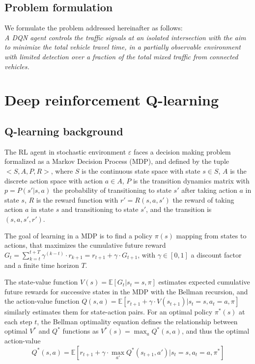 \documentclass[journal]{IEEEtran}
\begin{document}
\subsection{Problem formulation}
We formulate the problem addressed hereinafter as follows: \\
\textit{A DQN agent controls the traffic signals at an isolated intersection with the aim to minimize the total vehicle travel time, in a partially observable environment with limited detection over a fraction of the total mixed traffic from connected vehicles.}

\section{Deep reinforcement Q-learning}
\label{sec:dqn}

\subsection{Q-learning background}
The RL agent in stochastic environment $\varepsilon$ faces a decision making problem formalized as a Markov Decision Process (MDP), and defined by the tuple $<S,A,P,R>$, where $S$ is the continuous state space with state $s \in S$, $A$ is the discrete action space with action $a \in A$, $P$ is the transition dynamics matrix with $p=P(s'|s,a)$ the probability of transitioning to state $s'$ after taking action $a$ in state $s$, $R$ is the reward function with $r'=R(s,a,s')$ the reward of taking action $a$ in state $s$ and transitioning to state $s'$, and the transition is $(s,a,s',r')$.

The goal of learning in a MDP is to find a policy $\pi(s)$ mapping from states to actions, that maximizes the cumulative future reward $G_t = \sum_{k=t}^{t+T} \gamma^{(k-t)} \cdot r_{k+1} = r_{t+1} + \gamma \cdot G_{t+1}$, with $\gamma \in [0,1]$ a discount factor and a finite time horizon $T$.
    
The state-value function $V(s) = \mathbb{E}[G_{t} |s_t=s, \pi]$ estimates expected cumulative future rewards for successive states in the MDP with the Bellman recursion, and the action-value function $Q(s,a)= \mathbb{E}[r_{t+1} + \gamma \cdot V(s_{t+1}) |s_t=s, a_t=a, \pi]$ similarly estimates them for state-action pairs. For an optimal policy $\pi^*(s)$ at each step $t$, the Bellman optimality equation defines the relationship between optimal $V^*$ and $Q^*$ functions as $V^*(s) = \max_a Q^*(s,a)$, and thus the optimal action-value
\[ Q^*(s,a) = \mathbb{E}[r_{t+1} + \gamma \cdot \max_{a'}Q^*(s_{t+1},a')|s_t=s,a_t=a,\pi^*] \]
\end{document}
